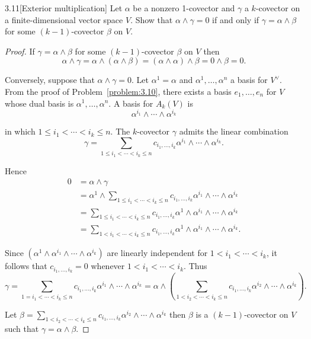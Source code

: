 \begin{problem}{3.11}[Exterior multiplication]
Let \( \alpha \) be a nonzero 1-covector and \( \gamma \) a \( k \)-covector on a finite-dimensional vector space \( V \). Show that \( \alpha \land \gamma = 0 \) if and only if \( \gamma = \alpha \land \beta \) for some \( (k-1) \)-covector \( \beta \) on \( V \).
\end{problem}

\begin{proof}
	If \( \gamma = \alpha \wedge \beta \) for some \( (k - 1) \)-covector \( \beta \) on \( V \) then
	\[
		\alpha \wedge \gamma = \alpha \wedge (\alpha \wedge \beta) = (\alpha \wedge \alpha) \wedge \beta = 0 \wedge \beta = 0.
	\]

	Conversely, suppose that \( \alpha \wedge \gamma = 0 \). Let \( \alpha^{1} = \alpha \) and \( \alpha^{1}, \ldots, \alpha^{n} \) a basis for \( V^{\vee} \). From the proof of Problem~\ref{problem:3.10}, there exists a basis \( e_{1}, \ldots, e_{n} \) for \( V \) whose dual basis is \( \alpha^{1}, \ldots, \alpha^{n} \). A basis for \( A_{k}(V) \) is
	\[
		\alpha^{i_{1}} \wedge \cdots \wedge \alpha^{i_{k}}
	\]

	in which \( 1 \leq i_{1} < \cdots < i_{k} \leq n \). The \( k \)-covector \( \gamma \) admits the linear combination
	\[
		\gamma = \sum_{1 \leq i_{1} < \cdots < i_{k} \leq n} c_{i_{1},\ldots,i_{k}} \alpha^{i_{1}} \wedge \cdots \wedge \alpha^{i_{k}}.
	\]

	Hence
	\begingroup
	\allowdisplaybreaks%
	\begin{align*}
		0 & = \alpha \wedge \gamma                                                                                                                    \\
		  & = \alpha^{1} \wedge \sum_{1 \leq i_{1} < \cdots < i_{k} \leq n} c_{i_{1},\ldots,i_{k}} \alpha^{i_{1}} \wedge \cdots \wedge \alpha^{i_{k}} \\
		  & = \sum_{1 \leq i_{1} < \cdots < i_{k} \leq n} c_{i_{1},\ldots,i_{k}} \alpha^{1}\wedge \alpha^{i_{1}} \wedge \cdots \wedge \alpha^{i_{k}}  \\
		  & = \sum_{1 < i_{1} < \cdots < i_{k} \leq n} c_{i_{1},\ldots,i_{k}} \alpha^{1}\wedge \alpha^{i_{1}} \wedge \cdots \wedge \alpha^{i_{k}}.
	\end{align*}
	\endgroup

	Since \( (\alpha^{1}\wedge \alpha^{i_{1}} \wedge \cdots \wedge \alpha^{i_{k}}) \) are linearly independent for \( 1 < i_{1} < \cdots < i_{k} \), it follows that \( c_{i_{1},\ldots,i_{k}} = 0 \) whenever \( 1 < i_{1} < \cdots < i_{k} \). Thus
	\[
		\gamma = \sum_{1 = i_{1} < \cdots < i_{k} \leq n} c_{i_{1},\ldots,i_{k}} \alpha^{i_{1}} \wedge \cdots \wedge \alpha^{i_{k}} = \alpha \wedge \left(\sum_{1 < i_{2} < \cdots < i_{k} \leq n} c_{i_{1},\ldots,i_{k}} \alpha^{i_{2}} \wedge \cdots \wedge \alpha^{i_{k}}\right).
	\]

	Let \( \beta = \sum_{1 < i_{2} < \cdots < i_{k} \leq n} c_{i_{1},\ldots,i_{k}} \alpha^{i_{2}} \wedge \cdots \wedge \alpha^{i_{k}} \) then \( \beta \) is a \( (k-1) \)-covector on \( V \) such that \( \gamma = \alpha \wedge \beta \).
\end{proof}

